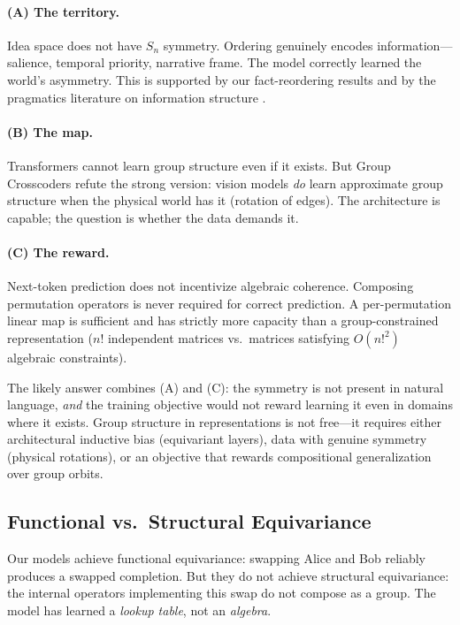 \documentclass[10pt, letterpaper]{article}
\begin{document}
\paragraph{(A) The territory.} Idea space does not have $S_n$ symmetry. Ordering genuinely encodes information---salience, temporal priority, narrative frame. The model correctly learned the world's asymmetry. This is supported by our fact-reordering results and by the pragmatics literature on information structure \cite{krifka2008, lambrecht1994}.

\paragraph{(B) The map.} Transformers cannot learn group structure even if it exists. But Group Crosscoders \cite{bhaskar2024group} refute the strong version: vision models \emph{do} learn approximate group structure when the physical world has it (rotation of edges). The architecture is capable; the question is whether the data demands it.

\paragraph{(C) The reward.} Next-token prediction does not incentivize algebraic coherence. Composing permutation operators is never required for correct prediction. A per-permutation linear map is sufficient and has strictly more capacity than a group-constrained representation ($n!$ independent matrices vs.\ matrices satisfying $O(n!^2)$ algebraic constraints).

The likely answer combines (A) and (C): the symmetry is not present in natural language, \emph{and} the training objective would not reward learning it even in domains where it exists. Group structure in representations is not free---it requires either architectural inductive bias (equivariant layers), data with genuine symmetry (physical rotations), or an objective that rewards compositional generalization over group orbits.

\subsection{Functional vs.\ Structural Equivariance}

Our models achieve functional equivariance: swapping Alice and Bob reliably produces a swapped completion. But they do not achieve structural equivariance: the internal operators implementing this swap do not compose as a group. The model has learned a \emph{lookup table}, not an \emph{algebra}.
\end{document}
